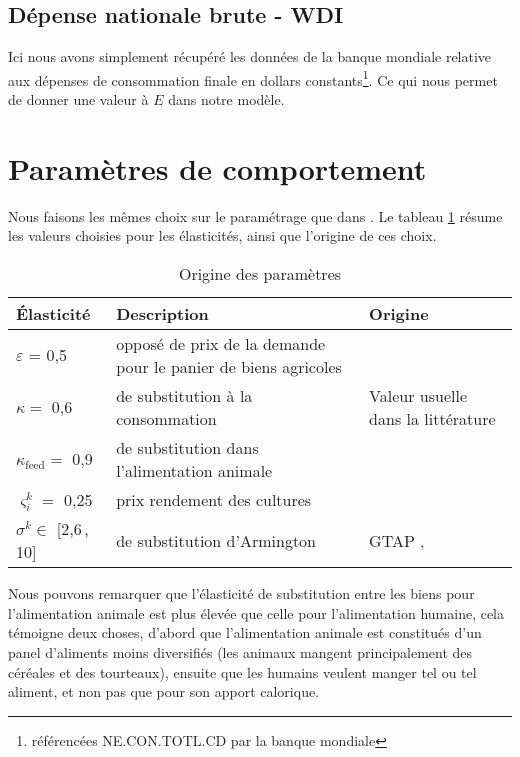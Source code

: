 \subsection{Dépense nationale brute - WDI}

Ici nous avons simplement récupéré les données de la banque mondiale relative aux dépenses de consommation finale en dollars constants\footnote{référencées NE.CON.TOTL.CD par la banque mondiale}. Ce qui nous permet de donner une valeur à $E$ dans notre modèle.


\section{Paramètres de comportement}
Nous faisons les mêmes choix sur le paramétrage que dans \cite{Gouel2025}. Le tableau \ref{tab:ela} résume les valeurs choisies pour les élasticités, ainsi que l'origine de ces choix.

\begin{table}[h]
    \centering
    \begin{tabularx}{\textwidth}{l >{\raggedright\arraybackslash}X >{\raggedright\arraybackslash}X}
        \textbf{Élasticité}        & \textbf{Description}                                           & \textbf{Origine}                                   \\ \hline
        $\varepsilon$ = 0,5        & opposé de prix de la demande pour le panier de biens agricoles & \cite{Comin2021}                                   \\
        $\kappa =$ 0,6             & de substitution à la consommation                              & Valeur usuelle dans la littérature \cite{Rude2000} \\
        $\kappa_\text{feed} =$ 0,9 & de substitution dans l'alimentation animale                    & \cite{Rude2000}                                    \\
        $\varsigma_i^k =$ 0,25     & prix rendement des cultures                                    & \cite{Keeney2009}                                  \\
        $\sigma^k \in$ [2,6\,, 10] & de substitution d'Armington                                    & GTAP  \cite{Aguiar2022}, \cite{Costinot2016}       \\
        \hline
    \end{tabularx}
    \caption{Origine des paramètres}
    \label{tab:ela}
\end{table}

Nous pouvons remarquer que l'élasticité de substitution entre les biens pour l'alimentation animale est plus élevée que celle pour l'alimentation humaine, cela témoigne deux choses, d'abord que l'alimentation animale est constitués d'un panel d'aliments moins diversifiés (les animaux mangent principalement des céréales et des tourteaux), ensuite que les humains veulent manger tel ou tel aliment, et non pas que pour son apport calorique.

